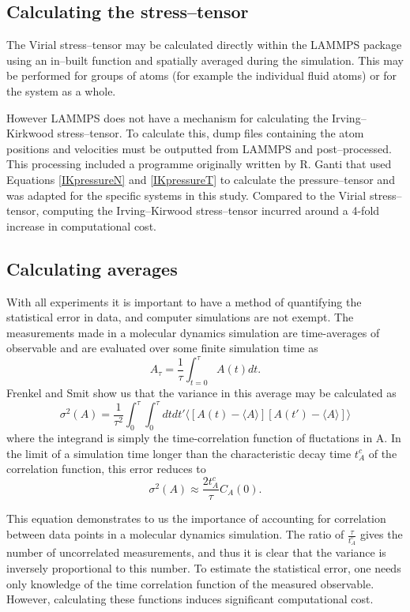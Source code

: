 \subsection{Calculating the stress--tensor}\label{CalcStress}
The Virial stress--tensor may be calculated directly within the LAMMPS package using an in--built function and spatially averaged during the simulation.
This may be performed for groups of atoms (for example the individual fluid atoms) or for the system as a whole.

However LAMMPS does not have a mechanism for calculating the Irving--Kirkwood stress--tensor.
To calculate this, dump files containing the atom positions and velocities must be outputted from LAMMPS and post--processed.
This processing included a programme originally written by R. Ganti that used Equations \ref{IKpressureN} and \ref{IKpressureT} to calculate the pressure--tensor and was adapted for the specific systems in this study. 
Compared to the Virial stress--tensor, computing the Irving--Kirwood stress--tensor incurred around a 4-fold increase in computational cost.

\subsection{Calculating averages}
With all experiments it is important to have a method of quantifying the statistical error in data, and computer simulations are not exempt.
The measurements made in a molecular dynamics simulation are time-averages of observable and are evaluated over some finite simulation time as
$$A_{\tau} = \frac{1}{\tau} \int_{t=0}^{\tau} A(t) dt.$$
Frenkel and Smit show us that the variance in this average may be calculated as 
$$\sigma^{2}(A) = \frac{1}{\tau^{2}} \int_{0}^{\tau} \int_{0}^{\tau} dt dt' \big \langle [ A(t) - \langle A \rangle ] [A(t') - \langle A \rangle] \big \rangle$$
where the integrand is simply the time-correlation function of fluctations in A\cite{FrenkelSmit}.
In the limit of a simulation time longer than the characteristic decay time $t_{A}^c$ of the correlation function, this error reduces to 
$$\sigma^{2}(A) \approx \frac{2t^{c}_{A}}{\tau}C_{A}(0).$$

This equation demonstrates to us the importance of accounting for correlation between data points in a molecular dynamics simulation. 
The ratio of $\frac{\tau}{t_{A}^{c}}$ gives the number of uncorrelated measurements, and thus it is clear that the variance is inversely proportional to this number.
To estimate the statistical error, one needs only knowledge of the time correlation function of the measured observable.
However, calculating these functions induces significant computational cost.

